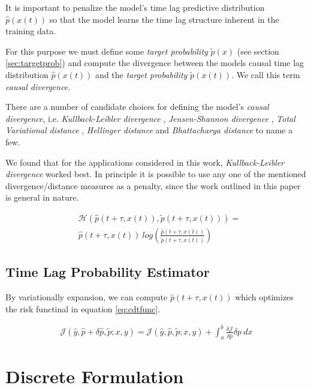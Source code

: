 \documentclass[envcountsect,runningheads]{llncs}
\theoremstyle{etoile}
\begin{document}
It is important to penalize the model's time lag predictive distribution 
$\hat{p}(x(t))$ so that the model learns the time lag structure inherent in the 
training data.

For this purpose we must define some \emph{target probability} $\tilde{p}(x)$ 
(see section \ref{sec:targetprob}) and compute the divergence between the models causal 
time lag distribution $\hat{p}(x(t))$ and the \emph{target probability} $\tilde{p}(x(t))$. 
We call this term \emph{causal divergence}.

There are a number of candidate choices for defining the model's \emph{causal divergence}, 
i.e.  \emph{Kullback-Leibler divergence} \cite{kullback1951}, 
\emph{Jensen-Shannon divergence} \cite{jensen-shannon}, \emph{Total Variational distance} 
\cite{villani2009three}, \emph{Hellinger distance} \cite{hellinger} and 
\emph{Bhattacharya distance} \cite{bhattacharyya} to name a few. 

We found that for the applications considered in this work, \emph{Kullback-Leibler divergence} 
worked best. In principle it is possible to use any one of the mentioned 
divergence/distance measures as a penalty, since the work outlined in this 
paper is general in nature.

\begin{align}\label{eq:causaldiv}
&\mathcal{H}\left(\hat{p}(t + \tau, x(t)), \tilde{p}(t + \tau, x(t))\right) = \\
&\nonumber \hat{p}(t + \tau, x(t)) \ log \left( \frac{\hat{p}(t + \tau, x(t))}{\tilde{p}(t + \tau, x(t))}\right)
\end{align}

\subsection{Time Lag Probability Estimator}

By variationally expansion, we can compute $\hat{p}(t + \tau, x(t))$ which optimizes the risk functinal in 
equation \ref{eq:cdtfunc}.

\begin{align}
      \mathcal{J}(\hat{y}, \hat{p} + \delta \hat{p}, \tilde{p}; x, y) = 
      \mathcal{J}(\hat{y}, \hat{p}, \tilde{p}; x, y) + 
      \int_a^b \frac{\delta \mathcal{J}}{\delta \hat{p}} {\delta p} \ dx
\end{align}


\section{Discrete Formulation}
\end{document}
